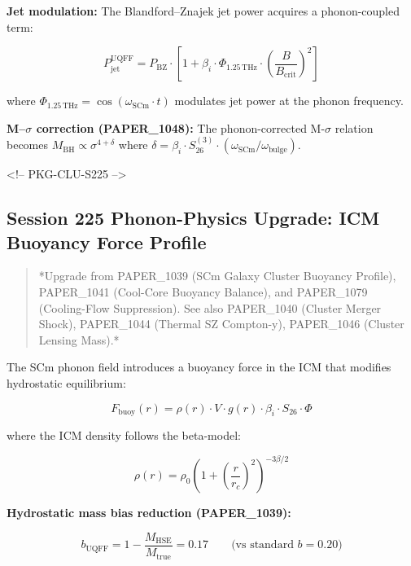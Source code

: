 \documentclass[12pt,a4paper]{article}
\begin{document}
\textbf{Jet modulation:} The Blandford--Znajek jet power acquires a phonon-coupled term:

\begin{equation}
P_{\text{jet}}^{\text{UQFF}} = P_{\text{BZ}} \cdot \left[1 + \beta_i \cdot \Phi_{1.25\,\text{THz}} \cdot \left(\frac{B}{B_{\text{crit}}}\right)^2\right]
\end{equation}

where $\Phi_{1.25\,\text{THz}} = \cos(\omega_{\text{SCm}} \cdot t)$ modulates jet power at the phonon frequency.

\textbf{M--$\sigma$ correction (PAPER\_1048):} The phonon-corrected M-$\sigma$ relation becomes $M_{\text{BH}} \propto \sigma^{4+\delta}$ where $\delta = \beta_i \cdot S_{26}^{(3)} \cdot (\omega_{\text{SCm}}/\omega_{\text{bulge}})$.

<!-- PKG-CLU-S225 -->

\subsection{Session 225 Phonon-Physics Upgrade: ICM Buoyancy Force Profile}

\begin{quote}
*Upgrade from PAPER\_1039 (SCm Galaxy Cluster Buoyancy Profile),
PAPER\_1041 (Cool-Core Buoyancy Balance), and PAPER\_1079 (Cooling-Flow
Suppression).  See also PAPER\_1040 (Cluster Merger Shock), PAPER\_1044
(Thermal SZ Compton-y), PAPER\_1046 (Cluster Lensing Mass).*
\end{quote}

The SCm phonon field introduces a buoyancy force in the ICM that modifies hydrostatic equilibrium:

\begin{equation}
F_{\text{buoy}}(r) = \rho(r) \cdot V \cdot g(r) \cdot \beta_i \cdot S_{26} \cdot \Phi
\end{equation}

where the ICM density follows the beta-model:

\begin{equation}
\rho(r) = \rho_0 \left(1 + \left(\frac{r}{r_c}\right)^2\right)^{-3\beta/2}
\end{equation}

\textbf{Hydrostatic mass bias reduction (PAPER\_1039):}

\begin{equation}
b_{\text{UQFF}} = 1 - \frac{M_{\text{HSE}}}{M_{\text{true}}} = 0.17 \qquad \text{(vs standard } b = 0.20\text{)}
\end{equation}
\end{document}
